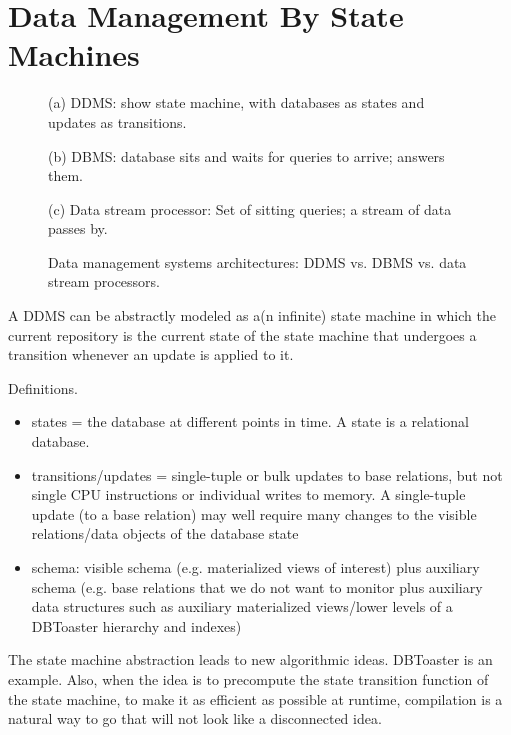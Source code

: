 

\section{Data Management By State Machines}


\begin{figure}
(a) DDMS: show state machine, with databases as states and updates as transitions.

(b) DBMS: database sits and waits for queries to arrive; answers them.

(c) Data stream processor: Set of sitting queries; a stream of data passes by.

\caption{Data management systems architectures: DDMS vs. DBMS vs. data stream processors.}
\end{figure}



A DDMS can be abstractly modeled as a(n infinite) state machine in which the current repository is the current state of the state machine that undergoes a transition whenever an update is applied to it.

Definitions.
\begin{itemize}
\item
states = the database at different points in time. A state is a relational database.

\item
transitions/updates = single-tuple or bulk updates to base relations, but not single CPU instructions or individual writes to memory. A single-tuple update (to a base relation) may well require many changes to the visible relations/data objects of the database state

\item
schema: visible schema (e.g. materialized views of interest) plus auxiliary schema (e.g. base relations that we do not want to monitor plus auxiliary data structures such as auxiliary materialized views/lower levels of a DBToaster hierarchy and indexes)
\end{itemize}


The state machine abstraction leads to new algorithmic ideas. DBToaster is an example. Also, when the idea is to precompute the state transition function of the state machine, to make it as efficient as possible at runtime, compilation is a natural way to go that will not look like a disconnected idea.


